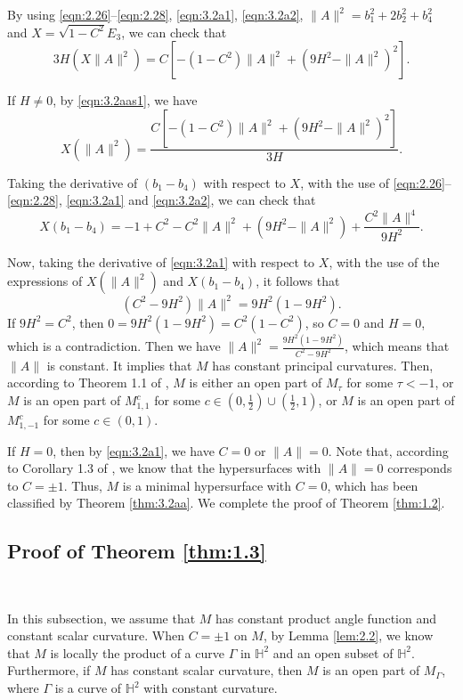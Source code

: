 \documentclass[reqno]{amsart}%
\theoremstyle{definition}
\numberwithin{equation}{section}
\begin{document}
By using \eqref{eqn:2.26}--\eqref{eqn:2.28}, \eqref{eqn:3.2a1}, \eqref{eqn:3.2a2},
$\|A\|^2=b_1^2+2b_2^2+b_4^2$ and $X=\sqrt{1-C^2}E_3$, we can check that
\begin{equation}\label{eqn:3.2aas1}
3H(X\|A\|^2)=C[-(1-C^2)\|A\|^2+(9H^2-\|A\|^2)^2].
\end{equation}

If $H\neq0$, by \eqref{eqn:3.2aas1}, we have
$$
X(\|A\|^2)=\frac{C[-(1-C^2)\|A\|^2+(9H^2-\|A\|^2)^2]}{3H}.
$$

Taking the derivative of $(b_1-b_4)$ with respect to $X$, with the use of \eqref{eqn:2.26}--\eqref{eqn:2.28}, \eqref{eqn:3.2a1} and \eqref{eqn:3.2a2}, we can check that
$$
X(b_1-b_4)=-1+C^2-C^2\|A\|^2+(9H^2-\|A\|^2)+\frac{C^2\|A\|^4}{9H^2}.
$$

Now, taking the derivative of \eqref{eqn:3.2a1} with respect to $X$, with the use of the expressions of $X(\|A\|^2)$ and $X(b_1-b_4)$, it follows that
$$
(C^2-9H^2)\|A\|^2=9H^2(1-9H^2).
$$
If $9H^2=C^2$, then $0=9H^2(1-9H^2)=C^2(1-C^2)$, so $C=0$ and $H=0$, which is a contradiction.
Then we have $\|A\|^2=\tfrac{9H^2(1-9H^2)}{C^2-9H^2}$,
which means that $\|A\|$ is constant. It implies that $M$ has constant principal curvatures.
Then, according to Theorem 1.1 of \cite{GMY},
$M$ is either an open part of $M_\tau$ for some $\tau<-1$, or
$M$ is an open part of $M_{1,1}^c$ for some $c\in(0,\frac{1}{2})\cup(\frac{1}{2},1)$, or
$M$ is an open part of $M_{1,-1}^c$ for some $c\in(0,1)$.

If $H=0$, then by \eqref{eqn:3.2a1}, we have $C=0$ or $\|A\|=0$. Note that,
according to Corollary 1.3 of \cite{Me-T}, we know that the hypersurfaces with $\|A\|=0$ corresponds to $C=\pm1$.
Thus, $M$ is a minimal hypersurface with $C=0$, which has been classified by Theorem \ref{thm:3.2aa}.
We complete the proof of Theorem \ref{thm:1.2}. 


\subsection{Proof of Theorem \ref{thm:1.3}}\label{sect:6.2}~

In this subsection, we assume that $M$ has constant product angle function and
constant scalar curvature.
When $C=\pm1$ on $M$, by Lemma \ref{lem:2.2}, we know that $M$ is locally the
product of a curve $\Gamma$ in $\mathbb{H}^2$ and an open
subset of $\mathbb{H}^2$. Furthermore, if $M$ has constant scalar curvature,
then $M$ is an open part of $M_\Gamma$, where $\Gamma$ is a curve of $\mathbb{H}^2$ with constant curvature.
\end{document}
